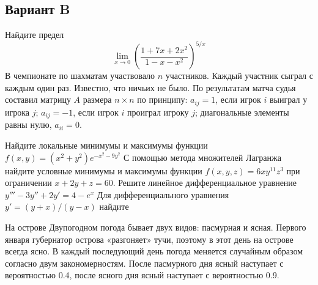 \documentclass[addpoints, answers]{exam} %
\begin{document}
\subsection{Вариант B}
\begin{questions}
\question  Найдите предел 
\[
\lim_{x\to 0} \left(\frac{1+7x+2x^2}{1-x-x^2} \right)^{5/x}
\]
\question В чемпионате по шахматам участвовало $n$ участников. Каждый участник сыграл с каждым один раз. Известно, что ничьих не было. По результатам матча судья составил матрицу $A$ размера $n\times n$ по принципу: $a_{ij}=1$, если игрок $i$ выиграл у игрока $j$; $a_{ij}=-1$, если игрок $i$ проиграл игроку $j$; диагональные элементы равны нулю, $a_{ii}=0$.
\question Найдите локальные минимумы и максимумы функции $f(x,y)=(x^2+y^2)e^{-x^2-9y^2}$
\question С помощью метода множителей Лагранжа найдите условные минимумы и максимумы функции $f(x,y,z)=6xy^{11}z^3$ при ограничении $x+2y+z=60$.
\question Решите линейное дифференциальное уравнение $y'''-3y''+2y'=4-e^{x}$
\question Для дифференциального уравнения $y'=(y+x)/(y-x)$ найдите
\question На острове Двупогодном погода бывает двух видов: пасмурная и ясная. Первого января губернатор острова «разгоняет»  тучи, поэтому в этот день на острове всегда ясно. В каждый последующий день погода меняется случайным образом согласно двум закономерностям. После пасмурного дня ясный наступает с  вероятностью 0.4, после ясного дня ясный наступает с вероятностью 0.9. 
\begin{parts}

\end{parts}
\end{questions}
\end{document}
